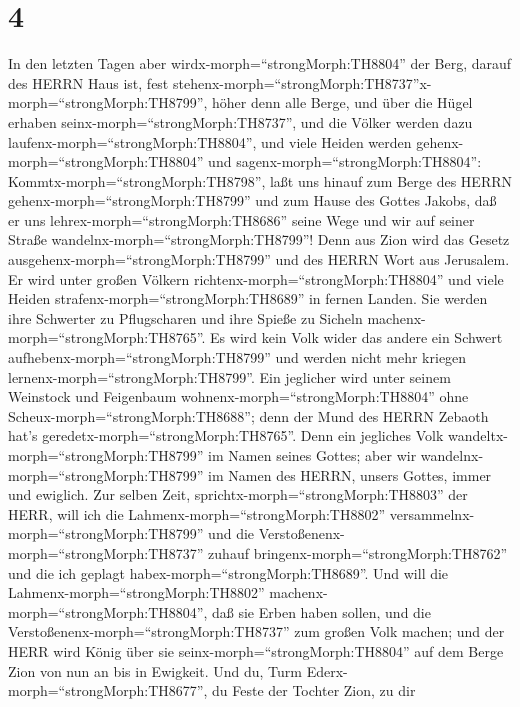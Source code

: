 \hypertarget{section-3}{%
\section{4}\label{section-3}}

 In den letzten Tagen aber
wirdx-morph=``strongMorph:TH8804'' der Berg, darauf des HERRN Haus ist,
fest stehenx-morph=``strongMorph:TH8737''x-morph=``strongMorph:TH8799'',
höher denn alle Berge, und über die Hügel erhaben
seinx-morph=``strongMorph:TH8737'', und die Völker werden dazu
laufenx-morph=``strongMorph:TH8804'',  und viele Heiden
werden gehenx-morph=``strongMorph:TH8804'' und
sagenx-morph=``strongMorph:TH8804'':
Kommtx-morph=``strongMorph:TH8798'', laßt uns hinauf zum Berge des HERRN
gehenx-morph=``strongMorph:TH8799'' und zum Hause des Gottes Jakobs, daß
er uns lehrex-morph=``strongMorph:TH8686'' seine Wege und wir auf seiner
Straße wandelnx-morph=``strongMorph:TH8799''! Denn aus Zion wird das
Gesetz ausgehenx-morph=``strongMorph:TH8799'' und des HERRN Wort aus
Jerusalem.  Er wird unter großen Völkern
richtenx-morph=``strongMorph:TH8804'' und viele Heiden
strafenx-morph=``strongMorph:TH8689'' in fernen Landen. Sie werden ihre
Schwerter zu Pflugscharen und ihre Spieße zu Sicheln
machenx-morph=``strongMorph:TH8765''. Es wird kein Volk wider das andere
ein Schwert aufhebenx-morph=``strongMorph:TH8799'' und werden nicht mehr
kriegen lernenx-morph=``strongMorph:TH8799''.  Ein jeglicher
wird unter seinem Weinstock und Feigenbaum
wohnenx-morph=``strongMorph:TH8804'' ohne
Scheux-morph=``strongMorph:TH8688''; denn der Mund des HERRN Zebaoth
hat's geredetx-morph=``strongMorph:TH8765''.  Denn ein
jegliches Volk wandeltx-morph=``strongMorph:TH8799'' im Namen seines
Gottes; aber wir wandelnx-morph=``strongMorph:TH8799'' im Namen des
HERRN, unsers Gottes, immer und ewiglich.  Zur selben Zeit,
sprichtx-morph=``strongMorph:TH8803'' der HERR, will ich die
Lahmenx-morph=``strongMorph:TH8802''
versammelnx-morph=``strongMorph:TH8799'' und die
Verstoßenenx-morph=``strongMorph:TH8737'' zuhauf
bringenx-morph=``strongMorph:TH8762'' und die ich geplagt
habex-morph=``strongMorph:TH8689''.  Und will die
Lahmenx-morph=``strongMorph:TH8802''
machenx-morph=``strongMorph:TH8804'', daß sie Erben haben sollen, und
die Verstoßenenx-morph=``strongMorph:TH8737'' zum großen Volk machen;
und der HERR wird König über sie seinx-morph=``strongMorph:TH8804'' auf
dem Berge Zion von nun an bis in Ewigkeit.  Und du, Turm
Ederx-morph=``strongMorph:TH8677'', du Feste der Tochter Zion, zu dir
